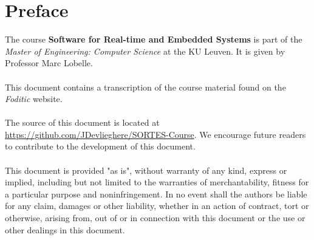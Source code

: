 \documentclass[main.tex]{subfiles}
\begin{document}
\chapter*{Preface}
The course \textbf{Software for Real-time and Embedded Systems} is part of the \textit{Master of Engineering: Computer Science} at the KU Leuven. It is given by Professor Marc Lobelle.
\\\\
This document contains a transcription of the course material found on the \textit{Foditic} website.
\\\\
The source of this document is located at \url{https://github.com/JDevlieghere/SORTES-Course}. We encourage future readers to contribute to the development of this document.
\\\\
This document is provided "as is", without warranty of any kind, express or implied, including but not limited to the warranties of merchantability, fitness for a particular purpose and noninfringement.
In no event shall the authors be liable for any claim, damages or other liability, whether in an action of contract, tort or otherwise, arising from, out of or in connection with this document or the use or other dealings in this document.
\end{document}
